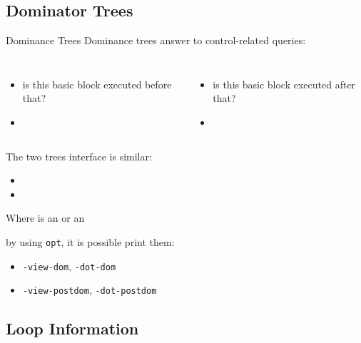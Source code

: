 \subsection{Dominator Trees}


\begin{frame}{Dominance Trees}
Dominance trees answer to control-related queries:

\begin{columns}[t]
\begin{itemize}
\item is this basic block executed before that?
\item {}
\end{itemize}

\begin{itemize}
\item is this basic block executed after that?
\item {}
\end{itemize}
\end{columns}

\vfill
The two trees interface is similar:

\begin{itemize}
\item {}
\item {}
\end{itemize}

Where  is an  or an

\vfill
by using \texttt{opt}, it is possible print them:

\begin{itemize}
\item \texttt{-view-dom}, \texttt{-dot-dom}
\item \texttt{-view-postdom}, \texttt{-dot-postdom}
\end{itemize}
\end{frame}


\subsection{Loop Information}



